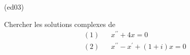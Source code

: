 \begin{tiny}(ed03)\end{tiny}
Chercher les solutions complexes de
\begin{align*}
&(1)& &x^{\prime \prime }+4x = 0 \\
&(2)& &x^{\prime \prime }-x^{\prime }+(1+i)x = 0
\end{align*}
